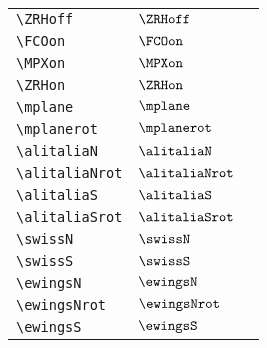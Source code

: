 \begin{longtable}{lll}
  {\color[rgb]{0.5,0.5,0.5}\texttt{\textbackslash ZRHoff}}                                                  & $\ZRHoff$                  & \\
  {\color[rgb]{0.5,0.5,0.5}\texttt{\textbackslash FCOon}}                                                   & $\FCOon$                   & \\
  {\color[rgb]{0.5,0.5,0.5}\texttt{\textbackslash MPXon}}                                                   & $\MPXon$                   & \\
  {\color[rgb]{0.5,0.5,0.5}\texttt{\textbackslash ZRHon}}                                                   & $\ZRHon$                   & \\
  {\color[rgb]{0.5,0.5,0.5}\texttt{\textbackslash mplane}}                                                  & $\mplane$                  & \\
  {\color[rgb]{0.5,0.5,0.5}\texttt{\textbackslash mplanerot}}                                               & $\mplanerot$               & \\
  {\color[rgb]{0.5,0.5,0.5}\texttt{\textbackslash alitaliaN}}                                               & $\alitaliaN$               & \\
  {\color[rgb]{0.5,0.5,0.5}\texttt{\textbackslash alitaliaNrot}}                                            & $\alitaliaNrot$            & \\
  {\color[rgb]{0.5,0.5,0.5}\texttt{\textbackslash alitaliaS}}                                               & $\alitaliaS$               & \\
  {\color[rgb]{0.5,0.5,0.5}\texttt{\textbackslash alitaliaSrot}}                                            & $\alitaliaSrot$            & \\
  {\color[rgb]{0.5,0.5,0.5}\texttt{\textbackslash swissN}}                                                  & $\swissN$                  & \\
  {\color[rgb]{0.5,0.5,0.5}\texttt{\textbackslash swissS}}                                                  & $\swissS$                  & \\
  {\color[rgb]{0.5,0.5,0.5}\texttt{\textbackslash ewingsN}}                                                 & $\ewingsN$                 & \\
  {\color[rgb]{0.5,0.5,0.5}\texttt{\textbackslash ewingsNrot}}                                              & $\ewingsNrot$              & \\
  {\color[rgb]{0.5,0.5,0.5}\texttt{\textbackslash ewingsS}}                                                 & $\ewingsS$                 & \\

\end{longtable}
